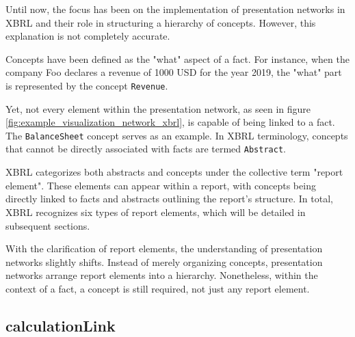 Until now, the focus has been on the implementation of presentation networks in XBRL and their role in structuring a hierarchy of concepts. 
However, this explanation is not completely accurate.

Concepts have been defined as the "what" aspect of a fact. For instance, when the company Foo declares a revenue of 1000 USD for the year 2019, 
the "what" part is represented by the concept \texttt{Revenue}.

Yet, not every element within the presentation network, as seen in figure \ref{fig:example_visualization_network_xbrl}, is capable of being linked to a fact. 
The \texttt{BalanceSheet} concept serves as an example. 
In XBRL terminology, concepts that cannot be directly associated with facts are termed \texttt{Abstract}.

XBRL categorizes both abstracts and concepts under the collective term "report element". 
These elements can appear within a report, with concepts being directly linked to facts and abstracts outlining the report's structure. 
In total, XBRL recognizes six types of report elements, which will be detailed in subsequent sections.

With the clarification of report elements, the understanding of presentation networks slightly shifts. 
Instead of merely organizing concepts, presentation networks arrange report elements into a hierarchy. 
Nonetheless, within the context of a fact, a concept is still required, not just any report element. 

\subsection{calculationLink}
\label{sec:calculationLink}



